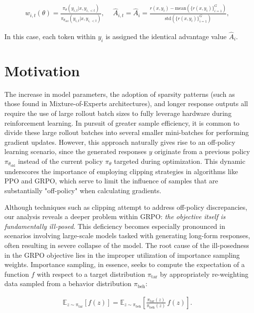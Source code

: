 \begin{align}
    w_{i,t}(\theta)=\frac{ \pi_{\theta} (y_{i,t} | x, y_{i,<t}) }{ \pi_{\theta_\text{old}} (y_{i,t} | x,y_{i,<t})},\quad\ 
    \widehat{A}_{i,t} = \widehat{A}_{i} = \frac{r(x, y_i) - \mathrm{mean} \left( \{ r(x, y_i) \}_{i=1}^G \right) }{ \mathrm{std} \left( \{ r(x, y_i) \}_{i=1}^G \right) },
\end{align}

In this case, each token within $y_i$ is assigned the identical advantage value $\widehat{A}_{i}$.

\section{Motivation}
\label{sec:motivation}

The increase in model parameters, the adoption of sparsity patterns (such as those found in Mixture-of-Experts architectures), and longer response outputs all require the use of large rollout batch sizes to fully leverage hardware during reinforcement learning. In pursuit of greater sample efficiency, it is common to divide these large rollout batches into several smaller mini-batches for performing gradient updates. However, this approach naturally gives rise to an off-policy learning scenario, since the generated responses $y$ originate from a previous policy $\pi_{\theta_\text{old}}$ instead of the current policy $\pi_\theta$ targeted during optimization. This dynamic underscores the importance of employing clipping strategies in algorithms like PPO and GRPO, which serve to limit the influence of samples that are substantially "off-policy" when calculating gradients.

Although techniques such as clipping attempt to address off-policy discrepancies, our analysis reveals a deeper problem within GRPO: \textit{the objective itself is fundamentally ill-posed}. This deficiency becomes especially pronounced in scenarios involving large-scale models tasked with generating long-form responses, often resulting in severe collapse of the model. The root cause of the ill-posedness in the GRPO objective lies in the improper utilization of importance sampling weights. Importance sampling, in essence, seeks to compute the expectation of a function $f$ with respect to a target distribution $\pi_\text{tar}$ by appropriately re-weighting data sampled from a behavior distribution $\pi_\text{beh}$:

\begin{align}
\mathbb{E}_{z \sim \pi_\text{tar}} \left[ f(z) \right] = \mathbb{E}_{z \sim \pi_\text{beh}} \left[ \frac{ \pi_\text{tar} (z) }{ \pi_\text{beh} (z)} \, f(z) \right].
\end{align}


